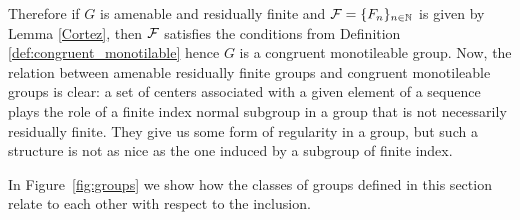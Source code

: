 \noindent
Therefore if $G$ is amenable and residually finite and $\operatorname{\mathcal{F}}=\{F_n\}_{n\in \mathbb{N}}$ is given by Lemma \ref{Cortez}, then $\operatorname{\mathcal{F}}$ satisfies the conditions from Definition \ref{def:congruent_monotilable} hence $G$ is a congruent monotileable group.
%
Now, the relation between amenable residually finite groups and congruent monotileable groups is clear: a set of centers associated with a given element of a \Folner sequence plays the role of a finite index normal subgroup in a group that is not necessarily residually finite. 
%
They give us some form of regularity in a group, but such a structure is not as nice as the one induced by a subgroup of finite index.


In Figure~\ref{fig:groups} we show how the classes of groups defined in this section relate to each other with respect to the inclusion.



